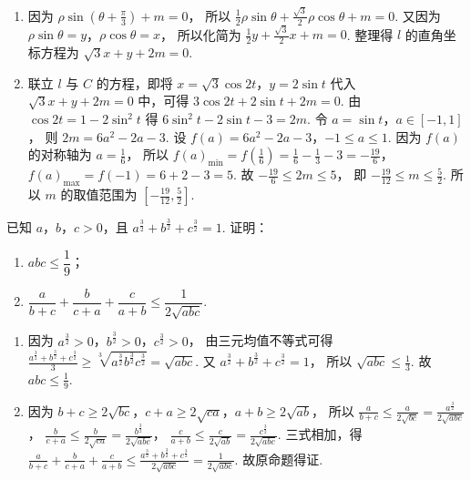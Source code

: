 \begin{solution}
\begin{enumerate}
\item 因为
\(\rho\sin\left(\theta+\frac{\pi}{3}\right)+m=0\)，
所以
\(\frac12\rho\sin\theta+\frac{\sqrt3}{2}\rho\cos\theta+m=0\).
又因为
\(\rho\sin\theta=y\)，\(\rho\cos\theta=x\)，
所以化简为
\(\frac12y+\frac{\sqrt3}{2}x+m=0\).
整理得 \(l\) 的直角坐标方程为
\(\sqrt3x+y+2m=0\).

\item 联立 \(l\) 与 \(C\) 的方程，即将
\(x=\sqrt3\cos2t\)，\(y=2\sin t\)
代入
\(\sqrt3x+y+2m=0\)
中，可得
\(3\cos2t+2\sin t+2m=0\).
由
\(\cos2t=1-2\sin^2t\)
得
\(6\sin^2t-2\sin t-3=2m\).
令
\(a=\sin t\)，\(a\in[-1,1]\)，
则
\(2m=6a^2-2a-3\).
设
\(f(a)=6a^2-2a-3\)，\(-1\le a\le1\).
因为 \(f(a)\) 的对称轴为
\(a=\frac16\)，
所以
\(f(a)_{\min}=f\left(\frac16\right)=\frac16-\frac13-3=-\frac{19}{6}\)，
\(f(a)_{\max}=f(-1)=6+2-3=5\).
故
\(-\frac{19}{6}\le2m\le5\)，
即
\(-\frac{19}{12}\le m\le\frac52\).
所以 \(m\) 的取值范围为
\(\left[-\frac{19}{12},\frac52\right]\).
\end{enumerate}
\end{solution}

\begin{problem}
已知 \(a\)，\(b\)，\(c>0\)，且 \(a^{\frac32}+b^{\frac32}+c^{\frac32}=1\). 证明：

\begin{enumerate}
\item \(abc\le\dfrac19\)；
\item \(\dfrac{a}{b+c}+\dfrac{b}{c+a}+\dfrac{c}{a+b}\le\dfrac{1}{2\sqrt{abc}}\).
\end{enumerate}
\end{problem}

\begin{solution}
\begin{enumerate}
\item 因为
\(a^{\frac32}>0\)，\(b^{\frac32}>0\)，\(c^{\frac32}>0\)，
由三元均值不等式可得 \(\frac{a^{\frac32}+b^{\frac32}+c^{\frac32}}{3}\ge\sqrt[3]{a^{\frac32}b^{\frac32}c^{\frac32}}=\sqrt{abc}\).
又
\(a^{\frac32}+b^{\frac32}+c^{\frac32}=1\)，
所以
\(\sqrt{abc}\le\frac13\).
故
\(abc\le\frac19\).

\item 因为
\(b+c\ge2\sqrt{bc}\)，\(c+a\ge2\sqrt{ca}\)，\(a+b\ge2\sqrt{ab}\)，
所以
\(\frac{a}{b+c}\le\frac{a}{2\sqrt{bc}}=\frac{a^{\frac32}}{2\sqrt{abc}}\)，
\(\frac{b}{c+a}\le\frac{b}{2\sqrt{ca}}=\frac{b^{\frac32}}{2\sqrt{abc}}\)，
\(\frac{c}{a+b}\le\frac{c}{2\sqrt{ab}}=\frac{c^{\frac32}}{2\sqrt{abc}}\).
三式相加，得 \(\frac{a}{b+c}+\frac{b}{c+a}+\frac{c}{a+b}\le\frac{a^{\frac32}+b^{\frac32}+c^{\frac32}}{2\sqrt{abc}}=\frac{1}{2\sqrt{abc}}\).
故原命题得证.
\end{enumerate}
\end{solution}
